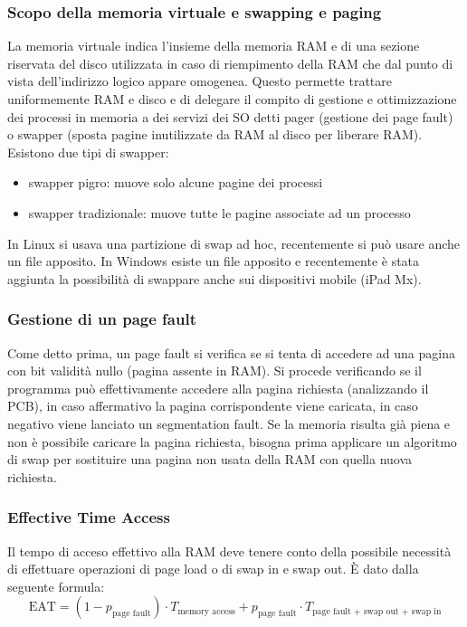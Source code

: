 \documentclass[a4paper]{article}
\begin{document}
\subsubsection*{Scopo della memoria virtuale e swapping e paging}
La memoria virtuale indica l'insieme della memoria RAM e di una sezione riservata del disco utilizzata in caso di riempimento della
RAM che dal punto di vista dell'indirizzo logico appare omogenea. Questo permette trattare uniformemente RAM e disco e di delegare
il compito di gestione e ottimizzazione dei processi in memoria a dei servizi dei SO detti pager (gestione dei page fault) o swapper
(sposta pagine inutilizzate da RAM al disco per liberare RAM). Esistono due tipi di swapper:
\begin{itemize}
	\item swapper pigro: muove solo alcune pagine dei processi
	\item swapper tradizionale: muove tutte le pagine associate ad un processo
\end{itemize}
In Linux si usava una partizione di swap ad hoc, recentemente si può usare anche un file apposito. In Windows esiste un file
apposito e recentemente è stata aggiunta la possibilità di swappare anche sui dispositivi mobile (iPad Mx).

\subsubsection*{Gestione di un page fault}
Come detto prima, un page fault si verifica se si tenta di accedere ad una pagina con bit validità nullo (pagina assente in RAM).
Si procede verificando se il programma può effettivamente accedere alla pagina richiesta (analizzando il PCB), in caso affermativo
la pagina corrispondente viene caricata, in caso negativo viene lanciato un segmentation fault. Se la memoria risulta già piena
e non è possibile caricare la pagina richiesta, bisogna prima applicare un algoritmo di swap per sostituire una pagina non usata
della RAM con quella nuova richiesta.

\subsubsection*{Effective Time Access}
Il tempo di acceso effettivo alla RAM deve tenere conto della possibile necessità di effettuare operazioni di page load o di swap
in e swap out. È dato dalla seguente formula:
\[\text{EAT} = (1-p_\text{page fault}) \cdot T_\text{memory access} + p_\text{page fault} \cdot T_\text{page fault + swap out + swap in}\]
\end{document}
